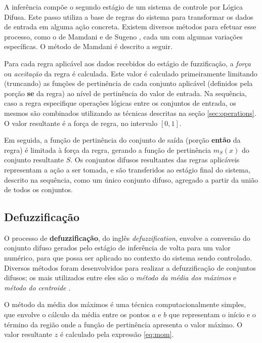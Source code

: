 \documentclass[12pt]{article}
\begin{document}
A inferência compõe o segundo estágio de um sistema de controle por Lógica Difusa. Este passo utiliza a base de regras do sistema para transformar os dados de entrada em alguma ação concreta. Existem diversos métodos para efetuar esse processo, como o de Mamdani \cite{Mamdani1975} e de Sugeno \cite{Sugeno1988}, cada um com algumas variações específicas. O método de Mamdani é descrito a seguir.

Para cada regra aplicável aos dados recebidos do estágio de fuzzificação, a \textit{força} ou \textit{aceitação} da regra é calculada. Este valor é calculado primeiramente limitando (truncando) as funções de pertinência de cada conjunto aplicável (definidos pela porção \textbf{se} da regra) ao nível de pertinência do valor de entrada. Na sequência, caso a regra especifique operações lógicas entre os conjuntos de entrada, os mesmos são combinados utilizando as técnicas descritas na seção \ref{sec:operations}. O valor resultante é a força de regra, no intervalo $[0, 1]$.


Em seguida, a função de pertinência do conjunto de saída (porção \textbf{então} da regra) é limitada à força da regra, gerando a função de pertinência $m_{S}(x)$ do conjunto resultante $S$. Os conjuntos difusos resultantes das regras aplicáveis representam a ação a ser tomada, e são transferidos ao estágio final do sistema, descrito na sequência, como um único conjunto difuso, agregado a partir da união de todos os conjuntos.

\subsection{Defuzzificação} \label{sec:defuzzification}

O processo de \textbf{defuzzificação}, do inglês \textit{defuzzification}, envolve a conversão do conjunto difuso gerados pelo estágio de inferência de volta para um valor numérico, para que possa ser aplicado no contexto do sistema sendo controlado. Diversos métodos foram desenvolvidos para realizar a defuzzificação de conjuntos difusos; os mais utilizados entre eles são o \textit{método da média dos máximos} e \textit{método do centroide} \cite{Ross2010}.

O método da média dos máximos é uma técnica computacionalmente simples, que envolve o cálculo da média entre os pontos $a$ e $b$ que representam o início e o término da região onde a função de pertinência apresenta o valor máximo. O valor resultante $z$ é calculado pela expressão \ref{eq:mom}.
\end{document}
